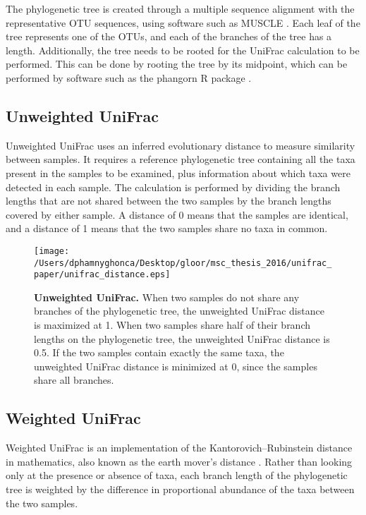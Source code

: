 \documentclass[10pt,letterpaper]{article}
\begin{document}
The phylogenetic tree is created through a multiple sequence alignment with the representative OTU sequences, using software such as MUSCLE \cite{edgar2004muscle}. Each leaf of the tree represents one of the OTUs, and each of the branches of the tree has a length. Additionally, the tree needs to be rooted for the UniFrac calculation to be performed. This can be done by rooting the tree by its midpoint, which can be performed by software such as the phangorn R package \cite{schliep2011phangorn}.

\subsection{Unweighted UniFrac}
Unweighted UniFrac \cite{lozupone2005unifrac} uses an inferred evolutionary distance to measure similarity between samples. It requires a reference phylogenetic tree containing all the taxa present in the samples to be examined, plus information about which taxa were detected in each sample. The calculation is performed by dividing the branch lengths that are not shared between the two samples by the branch lengths covered by either sample. A distance of 0 means that the samples are identical, and a distance of 1 means that the two samples share no taxa in common.

\begin{figure}[h]
\texttt{[image: /Users/dphamnyghonca/Desktop/gloor/msc\_thesis\_2016/unifrac\_paper/unifrac\_distance.eps]}
\caption{{\bf Unweighted UniFrac.}
When two samples do not share any branches of the phylogenetic tree, the unweighted UniFrac distance is maximized at 1. When two samples share half of their branch lengths on the phylogenetic tree, the unweighted UniFrac distance is 0.5. If the two samples contain exactly the same taxa, the unweighted UniFrac distance is minimized at 0, since the samples share all branches.}
\label{fig1}
\end{figure}

\subsection{Weighted UniFrac}
Weighted UniFrac \cite{lozupone2007quantitative} is an implementation of the Kantorovich–Rubinstein distance in mathematics, also known as the earth mover’s distance \cite{evans2012phylogenetic}. Rather than looking only at the presence or absence of taxa, each branch length of the phylogenetic tree is weighted by the difference in proportional abundance of the taxa between the two samples.
\end{document}

